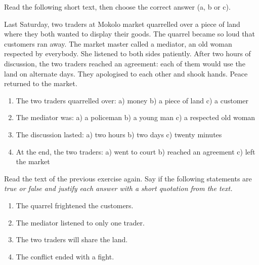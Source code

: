 \documentclass[11pt]{article}
\newcommand{\eng}[1]{\ifmmode\text{\textit{#1}}\else\begingroup\selectlanguage{english}\itshape #1\endgroup\fi}
\begin{document}
\begin{exercice}
Read the following short text, then choose the correct answer (a, b or c).

\begin{textebox}
Last Saturday, two traders at Mokolo market quarrelled over a piece of land where they both wanted to display their goods. The quarrel became so loud that customers ran away. The market master called a mediator, an old woman respected by everybody. She listened to both sides patiently. After two hours of discussion, the two traders reached an agreement: each of them would use the land on alternate days. They apologised to each other and shook hands. Peace returned to the market.
\end{textebox}

\begin{enumerate}
\item The two traders quarrelled over: \quad a) money \quad b) a piece of land \quad c) a customer
\item The mediator was: \quad a) a policeman \quad b) a young man \quad c) a respected old woman
\item The discussion lasted: \quad a) two hours \quad b) two days \quad c) twenty minutes
\item At the end, the two traders: \quad a) went to court \quad b) reached an agreement \quad c) left the market
\end{enumerate}
\end{exercice}

\begin{exercice}
Read the text of the previous exercise again. Say if the following statements are \eng{true} or \eng{false} and justify each answer with a short quotation from the text.

\begin{enumerate}
\item The quarrel frightened the customers.
\item The mediator listened to only one trader.
\item The two traders will share the land.
\item The conflict ended with a fight.
\end{enumerate}
\end{exercice}
\end{document}
